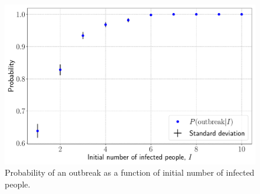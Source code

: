 \begin{figure}[htb]
	\centering
	\includegraphics[width=0.8\columnwidth]{../fig/2Bc_prob.pdf}
	\caption{Probability of an outbreak as a function of initial number of infected people.}
	\label{fig:prob_outbreak}
\end{figure}

\clearpage